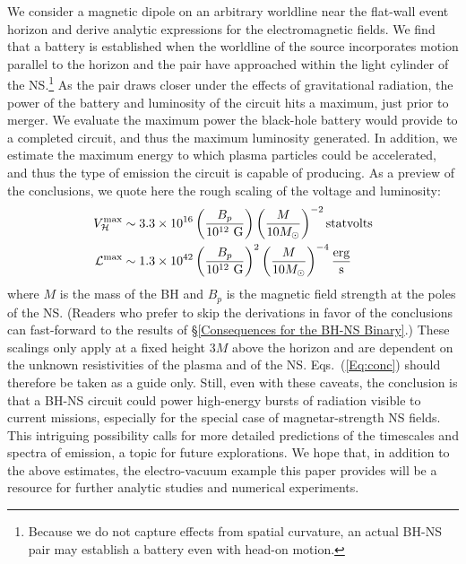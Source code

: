 We consider a magnetic dipole on an arbitrary worldline 
near the flat-wall event horizon and derive analytic expressions for the electromagnetic fields.
We find that 
a battery is established when the worldline of the source
incorporates motion parallel to the horizon and the pair have
approached within the light cylinder of the NS.\footnote{Because we
  do not capture effects from spatial curvature, an actual BH-NS pair
  may establish a battery even with head-on motion.} As the pair draws closer
under the effects of gravitational radiation, the power of the battery
and luminosity of the circuit hits a maximum, just prior to merger. We evaluate the maximum
power the black-hole battery would provide to a completed circuit, and thus the maximum
luminosity generated. In addition, we estimate the maximum
energy to which plasma particles
could be accelerated, and thus the type of emission the circuit is capable 
of producing.  
As a preview of the conclusions, we quote here the rough scaling of the voltage
and luminosity:
\begin{align}
V^{\rm{max}}_\mathcal{H} &\sim 3.3 \times 10^{16} \left( \frac{B_p}{10^{12}\ \rm{G}} \right) \left( \frac{M}{10 M_{\odot} } \right)^{-2} \rm{statvolts}  \nonumber\\
 \mathcal{L}^{\rm{max}} &\sim 1.3 \times 10^{42} \left(
 \frac{B_p}{10^{12}\ \rm{G}} \right)^2 \left( \frac{M}{10 M_{\odot} }
 \right)^{-4} \frac{\rm{erg}}{\rm{s}} 
\label{Eq:conc}
\end{align}
where $M$ is the mass of the BH and $B_p$ is the magnetic field strength at the poles of the
NS.
(Readers who prefer to skip the derivations in favor of the
conclusions can fast-forward to the results of \S \ref{Consequences for the BH-NS Binary}.)
These scalings only apply at a fixed height $3M$ above the horizon and are dependent on the unknown resistivities of the plasma
and of the NS. Eqs.\ (\ref{Eq:conc}) should therefore be taken as a guide only. Still, even with these
caveats, the conclusion is that a BH-NS circuit could power high-energy bursts of radiation 
visible to current missions, especially for the special case of magnetar-strength NS fields. This intriguing possibility calls for
more detailed predictions of the timescales and spectra of emission, a topic for future explorations.
We hope that, in addition to the above estimates, the 
electro-vacuum example this paper provides will be a resource for further analytic studies and numerical experiments.



